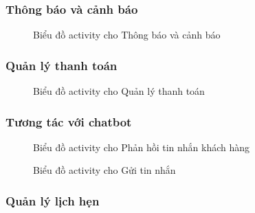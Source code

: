 \subsubsection{Thông báo và cảnh báo}
\begin{figure}[H]
    \centering
     
    \vspace{0.5cm}
    \caption{Biểu đồ activity cho Thông báo và cảnh báo}
    \label{fig:enter-label}
\end{figure}
\subsubsection{Quản lý thanh toán}
\begin{figure}[H]
    \centering
     
    \vspace{0.5cm}
    \caption{Biểu đồ activity cho Quản lý thanh toán}
    \label{fig:enter-label}
\end{figure}
\subsubsection{Tương tác với chatbot}
\begin{figure}[H]
    \centering
     
    \vspace{0.5cm}
    \caption{Biểu đồ activity cho Phản hồi tin nhắn khách hàng}
    \label{fig:enter-label}
\end{figure}
\begin{figure}[H]
    \centering
     
    \vspace{0.5cm}
    \caption{Biểu đồ activity cho Gửi tin nhắn}
    \label{fig:enter-label}
\end{figure}

\subsubsection{Quản lý lịch hẹn}




